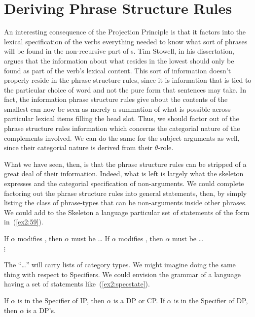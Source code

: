 \section{Deriving Phrase Structure Rules}

An interesting consequence of the Projection Principle is that it factors into the lexical specification of the verbs everything needed to know what sort of phrases will be found in the non-recursive part of s. Tim Stowell, in his dissertation,\cite{Stowell:1981} argues that the information about what resides in the lowest  should only be found as part of the verb's lexical content. This sort of information doesn't properly reside in the phrase structure rules, since it is information that is tied to the particular choice of word and not the pure form that sentences may take. In fact, the information phrase structure rules give about the contents of the smallest  can now be seen as merely a summation of what is possible across particular lexical items filling the head slot. Thus, we should factor out of the phrase structure rules information which concerns the categorial nature of the complements involved. We can do the same for the subject arguments as well, since their categorial nature is derived from their \mbox{$\theta$-role}.

What we have seen, then, is that the phrase structure rules can be stripped of a great deal of their information. Indeed, what is left is largely what the  skeleton expresses and the categorial specification of non-argu\-ments. We could complete factoring out the phrase structure rules into general statements, then, by simply listing the class of phrase-types that can be non-arguments inside other phrases. We could add to the  Skeleton a language particular set of statements of the form in~(\ref{ex2:59}).
\begin{exe}
	\ex \label{ex2:59}
	\begin{xlist}
	\ex If $\alpha$ modifies , then $\alpha$ must be \dots
	\ex If $\alpha$ modifies , then $\alpha$ must be \dots\\ \hspace*{1in}$\vdots$
	\end{xlist}
\end{exe}
The ``\dots'' will carry lists of category types. We might imagine doing the same thing with respect to Specifiers. We could envision the grammar of a language having a set of statements like~(\ref{ex2:specstate}).\enlargethispage*{\baselineskip}
\begin{exe}
	\ex \label{ex2:specstate} 
	\begin{xlist}
		\ex If $\alpha$ is in the Specifier of IP, then $\alpha$ is a DP or CP.
		\ex If $\alpha$ is in the Specifier of DP, then $\alpha$ is a DP's.
 	\end{xlist}
\end{exe}

